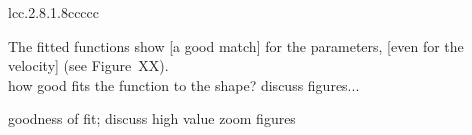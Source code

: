 \begin{table}[htb]
\begin{tabular}{lcc.{2.8}.{1.8}ccccc}
		\bottomrule
	\end{tabular}
	\label{tab:double_lognormal_fit_parameters}
\end{table}

The fitted functions show [a good match] for the parameters, [even for the velocity] (see Figure~XX).\\
how good fits the function to the shape? discuss figures...
\begin{figure}[htb]
\end{figure}

goodness of fit; discuss high value zoom figures\\


